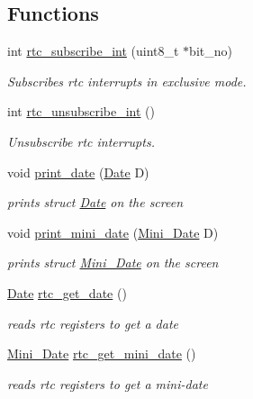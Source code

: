 \subsection*{Functions}
\begin{DoxyCompactItemize}
\item 
int \mbox{\hyperlink{group__rtc_ga5171a9c0f54940fe60f7500896afcc86}{rtc\+\_\+subscribe\+\_\+int}} (uint8\+\_\+t $\ast$bit\+\_\+no)
\begin{DoxyCompactList}\small\item\em Subscribes rtc interrupts in exclusive mode. \end{DoxyCompactList}\item 
int \mbox{\hyperlink{group__rtc_gab8f17bf5280c908c8b199a90fefcc758}{rtc\+\_\+unsubscribe\+\_\+int}} ()
\begin{DoxyCompactList}\small\item\em Unsubscribe rtc interrupts. \end{DoxyCompactList}\item 
void \mbox{\hyperlink{group__rtc_ga322a0169ef9255eb9b048ab656fd6b06}{print\+\_\+date}} (\mbox{\hyperlink{struct_date}{Date}} D)
\begin{DoxyCompactList}\small\item\em prints struct \mbox{\hyperlink{struct_date}{Date}} on the screen \end{DoxyCompactList}\item 
void \mbox{\hyperlink{group__rtc_ga5b6078e999e62dd4c58f70ebbfe32c53}{print\+\_\+mini\+\_\+date}} (\mbox{\hyperlink{struct_mini___date}{Mini\+\_\+\+Date}} D)
\begin{DoxyCompactList}\small\item\em prints struct \mbox{\hyperlink{struct_mini___date}{Mini\+\_\+\+Date}} on the screen \end{DoxyCompactList}\item 
\mbox{\hyperlink{struct_date}{Date}} \mbox{\hyperlink{group__rtc_ga4b3527c6c15373fa4ccbf8c43557531d}{rtc\+\_\+get\+\_\+date}} ()
\begin{DoxyCompactList}\small\item\em reads rtc registers to get a date \end{DoxyCompactList}\item 
\mbox{\hyperlink{struct_mini___date}{Mini\+\_\+\+Date}} \mbox{\hyperlink{group__rtc_gafd5a541a5a16634152431be542dc9565}{rtc\+\_\+get\+\_\+mini\+\_\+date}} ()
\begin{DoxyCompactList}\small\item\em reads rtc registers to get a mini-\/date \end{DoxyCompactList}\item 

\end{DoxyCompactItemize}
